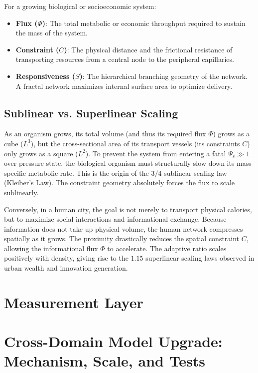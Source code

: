 \documentclass[11pt,a4paper]{article}
\begin{document}
For a growing biological or socioeconomic system:
\begin{itemize}
    \item \textbf{Flux ($\Phi$)}: The total metabolic or economic throughput required to sustain the mass of the system.
    \item \textbf{Constraint ($C$)}: The physical distance and the frictional resistance of transporting resources from a central node to the peripheral capillaries.
    \item \textbf{Responsiveness ($S$)}: The hierarchical branching geometry of the network. A fractal network maximizes internal surface area to optimize delivery.
\end{itemize}

\subsection{Sublinear vs. Superlinear Scaling}
As an organism grows, its total volume (and thus its required flux $\Phi$) grows as a cube ($L^3$), but the cross-sectional area of its transport vessels (its constraints $C$) only grows as a square ($L^2$). To prevent the system from entering a fatal $\Psi_s \gg 1$ over-pressure state, the biological organism must structurally slow down its mass-specific metabolic rate. This is the origin of the $3/4$ sublinear scaling law (Kleiber's Law). The constraint geometry absolutely forces the flux to scale sublinearly.

Conversely, in a human city, the goal is not merely to transport physical calories, but to maximize social interactions and informational exchange. Because information does not take up physical volume, the human network compresses spatially as it grows. The proximity drastically reduces the spatial constraint $C$, allowing the informational flux $\Phi$ to accelerate. The adaptive ratio scales positively with density, giving rise to the $1.15$ superlinear scaling laws observed in urban wealth and innovation generation.



\section{Measurement Layer}

\section{Cross-Domain Model Upgrade: Mechanism, Scale, and Tests}
\end{document}
